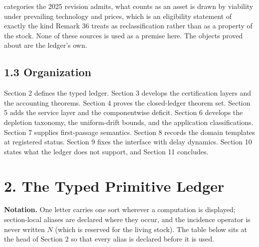\documentclass[11pt]{article}
\begin{document}
categories the 2025 revision admits, what counts as an asset is drawn by viability under prevailing technology and prices, which is an eligibility statement of exactly the kind Remark 36 treats as reclassification rather than as a property of the stock. None of these sources is used as a premise here. The objects proved about are the ledger's own.

\subsection*{1.3 Organization}\label{13-organization}

Section 2 defines the typed ledger. Section 3 develops the certification layers and the accounting theorems. Section 4 proves the closed-ledger theorem set. Section 5 adds the service layer and the componentwise deficit. Section 6 develops the depletion taxonomy, the uniform-drift bounds, and the application classifications. Section 7 supplies first-passage semantics. Section 8 records the domain templates at registered status. Section 9 fixes the interface with delay dynamics. Section 10 states what the ledger does not support, and Section 11 concludes.

\vspace{0.8em}

\section*{2. The Typed Primitive Ledger}\label{2-the-typed-primitive-ledger}

\textbf{Notation.} One letter carries one sort wherever a computation is displayed; section-local aliases are declared where they occur, and the incidence operator is never written \(N\) (which is reserved for the living stock). The table below sits at the head of Section 2 so that every alias is declared before it is used.
\end{document}
